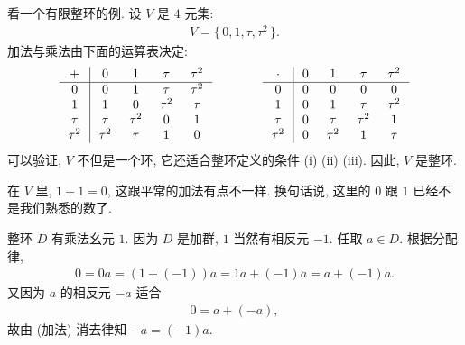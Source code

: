 \begin{example}
    看一个有限整环的例. 设 $V$  是 $4$ 元集:
    \begin{align*}
        V = \{\, 0,1,\tau,\tau^2 \,\}.
    \end{align*}
    加法与乘法由下面的运算表决定:
    \begin{align*}
        \arraycolsep=0.25cm
        \begin{array}{c|cccc}
            +      & 0      & 1      & \tau   & \tau^2 \\ \hline
            0      & 0      & 1      & \tau   & \tau^2 \\
            1      & 1      & 0      & \tau^2 & \tau   \\
            \tau   & \tau   & \tau^2 & 0      & 1      \\
            \tau^2 & \tau^2 & \tau   & 1      & 0      \\
        \end{array}
        \qquad \qquad
        \begin{array}{c|cccc}
            \cdot  & 0 & 1      & \tau   & \tau^2 \\ \hline
            0      & 0 & 0      & 0      & 0      \\
            1      & 0 & 1      & \tau   & \tau^2 \\
            \tau   & 0 & \tau   & \tau^2 & 1      \\
            \tau^2 & 0 & \tau^2 & 1      & \tau   \\
        \end{array}
    \end{align*}
    可以验证, $V$ 不但是一个环, 它还适合整环定义的条件 (i) (ii) (iii). 因此, $V$ 是整环.

    在 $V$ 里, $1+1=0$, 这跟平常的加法有点不一样. 换句话说, 这里的 $0$ 跟 $1$ 已经不是我们熟悉的数了.
\end{example}

\begin{remark}
    整环 $D$ 有乘法幺元 $1$. 因为 $D$ 是加群, $1$ 当然有相反元 $-1$. 任取 $a \in D$. 根据分配律,
    \begin{align*}
        0 = 0a = (1 + (-1))a = 1a + (-1)a = a + (-1)a.
    \end{align*}
    又因为 $a$ 的相反元 $-a$ 适合
    \begin{align*}
        0 = a + (-a),
    \end{align*}
    故由 (加法) 消去律知 $-a = (-1)a$.
\end{remark}

